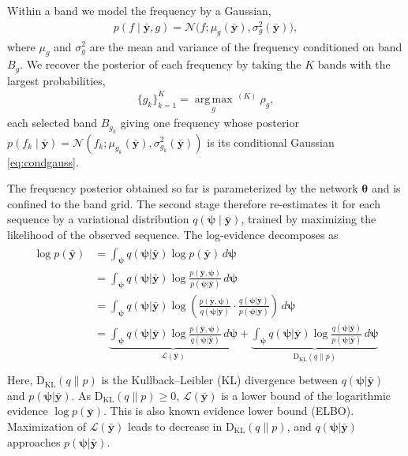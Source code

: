 \documentclass[journal,onecolumn]{IEEEtran}
\begin{document}
Within a band we model the frequency by a Gaussian,
\begin{eqnarray}
\label{eq:condgauss}
p(f\mid\bar{\mathbf{y}},g)=\mathcal{N}\!\big(f;\mu_g(\bar{\mathbf{y}}),\sigma_g^2(\bar{\mathbf{y}})\big),
\end{eqnarray}
where $\mu_g$ and $\sigma_g^2$ are the mean and variance of the frequency conditioned on band $B_g$. We recover the posterior of each frequency by taking the $K$ bands with the largest probabilities,
\begin{eqnarray}
\label{eq:pick}
\{g_k\}_{k=1}^{K}=\operatorname*{arg\,max}_{g}{}^{\,(K)}\ \rho_g,
\end{eqnarray}
each selected band $B_{g_k}$ giving one frequency whose posterior $p(f_k\mid\bar{\mathbf{y}})=\mathcal{N}(f_k;\mu_{g_k}(\bar{\mathbf{y}}),\sigma_{g_k}^2(\bar{\mathbf{y}}))$ is its conditional Gaussian \eqref{eq:condgauss}. 

The frequency posterior obtained so far is parameterized by the network $\pmb{\theta}$ and is confined to the band grid. The second stage therefore re-estimates it for each sequence by a variational distribution $q(\pmb{\psi}\mid\bar{\mathbf{y}})$, trained by maximizing the likelihood of the observed sequence. The log-evidence decomposes as
\begin{eqnarray}
\label{eq:logevi}
    \begin{array}{rl}
      \log p(\bar{\mathbf{y}})   & = \displaystyle\int_{\pmb{\psi}} q(\pmb{\psi} | \bar{\mathbf{y}})  \log p(\bar{\mathbf{y}}) \, d\pmb{\psi} \\
         & = \displaystyle\int_{\pmb{\psi}} q(\pmb{\psi} | \bar{\mathbf{y}})  \log \frac{p(\bar{\mathbf{y}},\pmb{\psi})}{p(\pmb{\psi}|\bar{\mathbf{y}})} \, d\pmb{\psi} \\
         & = \displaystyle\int_{\pmb{\psi}} q(\pmb{\psi} | \bar{\mathbf{y}})  \log \left( \frac{p(\bar{\mathbf{y}},\pmb{\psi})} {q(\pmb{\psi} | \bar{\mathbf{y}})} \cdot \frac{q(\pmb{\psi} | \bar{\mathbf{y}})}{p(\pmb{\psi}|\bar{\mathbf{y}})} \right) \, d\pmb{\psi} \\
         & = \underbrace{\displaystyle\int_{\pmb{\psi}} q(\pmb{\psi} | \bar{\mathbf{y}})  \log  \frac{p(\bar{\mathbf{y}},\pmb{\psi})} {q(\pmb{\psi} | \bar{\mathbf{y}})}  \, d\pmb{\psi}}_{\mathcal{L}(\bar{\mathbf{y}})} + \underbrace{\displaystyle\int_{\pmb{\psi}} q(\pmb{\psi} | \bar{\mathbf{y}})  \log \frac{q(\pmb{\psi} | \bar{\mathbf{y}})}{p(\pmb{\psi}|\bar{\mathbf{y}})} \, d\pmb{\psi} }_{\mathrm{D}_{\mathrm{KL}}(q\|p)} \\
    \end{array}
\end{eqnarray}
Here, $\mathrm{D}_{\mathrm{KL}}(q\|p)$ is the Kullback–Leibler (KL) divergence between $q(\pmb{\psi} | \bar{\mathbf{y}})$ and $p(\pmb{\psi} | \bar{\mathbf{y}})$. As $\mathrm{D}_{\mathrm{KL}}(q\|p) \geq 0$,  $\mathcal{L}(\bar{\mathbf{y}})$ is a lower bound of the logarithmic evidence $\log p(\bar{\mathbf{y}})$. This is also known evidence lower bound (ELBO). Maximization of $\mathcal{L}(\bar{\mathbf{y}})$ leads to decrease in $\mathrm{D}_{\mathrm{KL}}(q\|p)$, and $q(\pmb{\psi} | \bar{\mathbf{y}})$ approaches  $p(\pmb{\psi} | \bar{\mathbf{y}})$.
\end{document}
